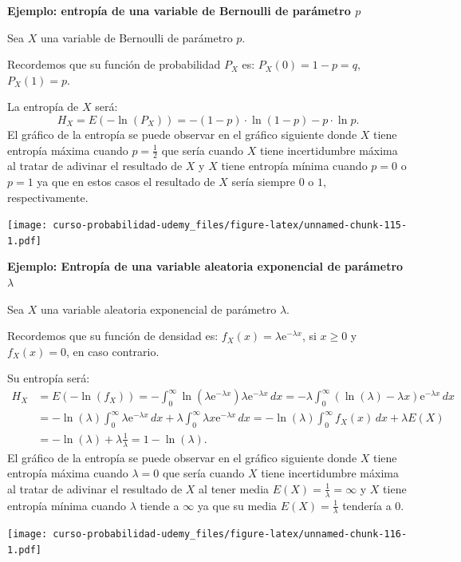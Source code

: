 \documentclass[]{book}
\begin{document}
\textbf{Ejemplo: entropía de una variable de Bernoulli de parámetro \(p\)}

Sea \(X\) una variable de Bernoulli de parámetro \(p\).

Recordemos que su función de probabilidad \(P_X\) es: \(P_X(0)=1-p=q,\) \(P_X(1)=p\).

La entropía de \(X\) será:
\[
H_X = E\left(-\ln(P_X)\right) = -(1-p)\cdot \ln(1-p)-p\cdot \ln p.
\]
El gráfico de la entropía se puede observar en el gráfico siguiente donde \(X\) tiene entropía máxima cuando \(p=\frac{1}{2}\) que sería cuando \(X\) tiene incertidumbre máxima al tratar de adivinar el resultado de \(X\) y \(X\) tiene entropía mínima cuando \(p=0\) o \(p=1\) ya que en estos casos el resultado de \(X\) sería siempre \(0\) o \(1\), respectivamente.

\texttt{[image: curso-probabilidad-udemy\_files/figure-latex/unnamed-chunk-115-1.pdf]}

\textbf{Ejemplo: Entropía de una variable aleatoria exponencial de parámetro \(\lambda\)}

Sea \(X\) una variable aleatoria exponencial de parámetro \(\lambda\).

Recordemos que su función de densidad es: \(f_X(x)=\lambda \mathrm{e}^{-\lambda x}\), si \(x\geq 0\) y \(f_X(x)=0\), en caso contrario.

Su entropía será:
\[
\begin{array}{rl}
H_X & = \displaystyle E\left(-\ln(f_X)\right)=-\int_0^\infty \ln\left(\lambda\mathrm{e}^{-\lambda x}\right)\lambda\mathrm{e}^{-\lambda x}\, dx = -\lambda \int_0^\infty (\ln(\lambda) -\lambda x)\mathrm{e}^{-\lambda x}\, dx \\[1ex] & =\displaystyle -\ln (\lambda)\int_0^\infty \lambda\mathrm{e}^{-\lambda x}\, dx+\lambda \int_0^\infty \lambda x \mathrm{e}^{-\lambda x}\, dx =-\ln(\lambda)\int_0^\infty f_X(x)\, dx +\lambda E(X)\\[1ex] & =\displaystyle -\ln(\lambda)+\lambda \frac{1}{\lambda} =1-\ln(\lambda).
\end{array}
\]
El gráfico de la entropía se puede observar en el gráfico siguiente donde \(X\) tiene entropía máxima cuando \(\lambda=0\) que sería cuando \(X\) tiene incertidumbre máxima al tratar de adivinar el resultado de \(X\) al tener media \(E(X)=\frac{1}{\lambda}=\infty\) y \(X\) tiene entropía mínima cuando \(\lambda\) tiende a \(\infty\) ya que su media \(E(X)=\frac{1}{\lambda}\) tendería a 0.

\texttt{[image: curso-probabilidad-udemy\_files/figure-latex/unnamed-chunk-116-1.pdf]}
\end{document}

